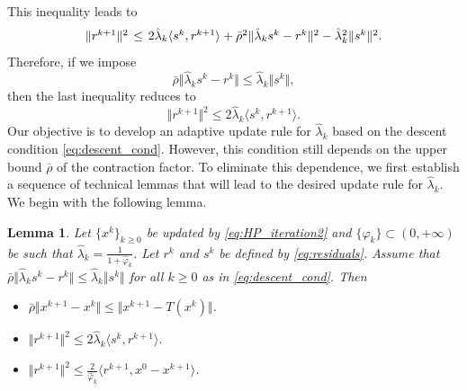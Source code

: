 \documentclass{article}
\theoremstyle{plain}
\newtheorem{lemma}{Lemma}[section]
\theoremstyle{definition}
\newcommand{\sets}[1]{\{#1\}}
\newcommand{\norms}[1]{\Vert#1\Vert}
\newcommand{\iprods}[1]{\langle #1\rangle}
\newcommand{\0}{\boldsymbol{0}}
\begin{document}
This inequality leads to 
\begin{equation*}
\arraycolsep=0.2em
\begin{array}{lcl}
\norms{r^{k+1}}^2 &\leq & 2\hat{\lambda}_k\iprods{s^k,  r^{k+1}} + \bar{\rho}^2\norms{\hat{\lambda}_ks^k - r^k}^2  - \hat{\lambda}_k^2\norms{s^k}^2.
\end{array}
\end{equation*}
Therefore, if we impose 
\begin{equation}\label{eq:descent_cond}
\bar{\rho} \norms{\hat{\lambda}_ks^k - r^k}  \leq \hat{\lambda}_k\norms{s^k},
\end{equation}
then the last inequality reduces to
\begin{equation}\label{eq:descent_pro}
\norms{r^{k+1} }^2 \leq  2\hat{\lambda}_k\iprods{s^k, r^{k+1}}.
\end{equation}
Our objective is to develop an adaptive update rule for $\hat{\lambda}_k$ based on the descent condition \eqref{eq:descent_cond}. 
However, this condition still depends on the upper bound $\bar{\rho}$ of the contraction factor. 
To eliminate this dependence, we first establish a sequence of technical lemmas that will lead to the desired update rule for $\hat{\lambda}_k$. 
We begin with the following lemma.

\begin{lemma}\label{le:key_properties}
Let $\sets{x^k}_{k \geq 0}$ be updated by \eqref{eq:HP_iteration2} and $\sets{\hat{\varphi}_k} \subset (0, +\infty)$ be such that $\hat{\lambda}_k = \frac{1}{1 + \hat{\varphi}_k}$.
Let $r^k$ and $s^k$ be defined by \eqref{eq:residuals}.
Assume that $\bar{\rho} \norms{\hat{\lambda}_ks^k - r^k}  \leq \hat{\lambda}_k\norms{s^k}$ for all $k \geq 0$ as in \eqref{eq:descent_cond}.
Then
\begin{itemize}
\item[{\rm(i)}]  $\bar{\rho}\norms{x^{k+1} -  x^k} \leq \norms{ x^{k+1} - T(x^k) }$.
\item[{\rm(ii)}] $\norms{ r^{k+1} }^2 \leq 2 \hat{\lambda}_k \iprods{s^k, r^{k+1}}$.
\item[{\rm(iii)}] $\norms{ r^{k+1}}^2 \leq \frac{2}{\hat{\varphi}_k} \iprods{ r^{k+1}, x^0 - x^{k+1}}$.
\end{itemize}
\end{lemma}
\end{document}
